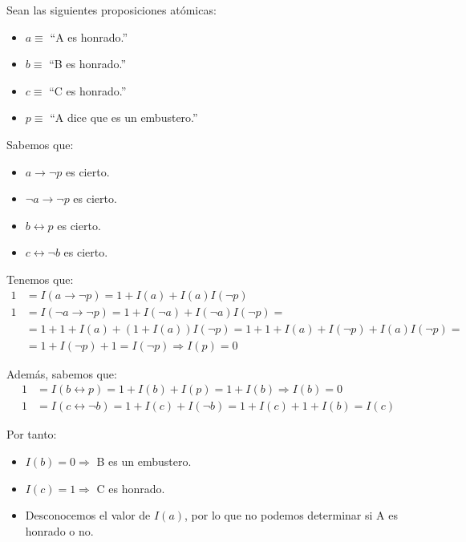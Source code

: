 \begin{ejercicio}
\begin{enumerate}
        Sean las siguientes proposiciones atómicas:
        \begin{itemize}
            \item $a\equiv$ ``A es honrado.''
            \item $b\equiv$ ``B es honrado.''
            \item $c\equiv$ ``C es honrado.''
            \item $p\equiv$ ``A dice que es un embustero.''
        \end{itemize}

        Sabemos que:
        \begin{itemize}
            \item $a\longrightarrow \neg p$ es cierto.
            \item $\neg a\longrightarrow \neg p$ es cierto.
            \item $b\longleftrightarrow p$ es cierto.
            \item $c\longleftrightarrow \neg b$ es cierto.
        \end{itemize}

        Tenemos que:
        \begin{align*}
            1&= I(a\longrightarrow \neg p) = 1+I(a)+I(a)I(\neg p)\\
            1&= I(\neg a\longrightarrow \neg p) = 1+I(\neg a)+I(\neg a)I(\neg p)
            =\\&= 1+1+I(a) + (1+I(a))I(\neg p) =
            1+1+I(a)+I(\neg p)+I(a)I(\neg p)=\\&=1+I(\neg p)+1=I(\neg p)\Longrightarrow
            I(p)=0
        \end{align*}

        Además, sabemos que:
        \begin{align*}
            1&= I(b\longleftrightarrow p) = 1+I(b)+I(p)=1+I(b)\Longrightarrow
            I(b)=0\\
            1&= I(c\longleftrightarrow \neg b) = 1+I(c)+I(\neg b)=1+I(c)+1+I(b)=I(c)
        \end{align*}

        Por tanto:
        \begin{itemize}
            \item $I(b)=0\Longrightarrow$ B es un embustero.
            \item $I(c)=1\Longrightarrow$ C es honrado.
            \item Desconocemos el valor de $I(a)$, por lo que no podemos determinar si A es honrado o no.
        \end{itemize}
    \end{enumerate}
\end{ejercicio}


